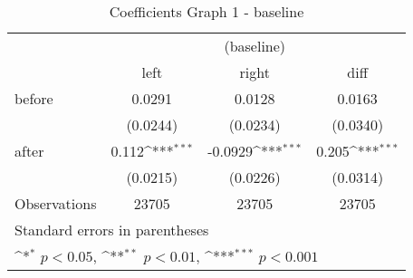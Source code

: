 \begin{table}[!ht]\centering \footnotesize
\def\sym#1{\ifmmode^{#1}\else\(^{#1}\)\fi}
\caption{Coefficients Graph 1 - baseline}
\begin{tabular}{l*{3}{c}}
\hline\hline
                    &\multicolumn{3}{c}{(baseline)}\\
                    &\multicolumn{1}{c}{left}&\multicolumn{1}{c}{right}&\multicolumn{1}{c}{diff}\\
\hline
before              &      0.0291         &      0.0128         &      0.0163         \\
                    &    (0.0244)         &    (0.0234)         &    (0.0340)         \\
[0.5em]
after               &       0.112\sym{***}&     -0.0929\sym{***}&       0.205\sym{***}\\
                    &    (0.0215)         &    (0.0226)         &    (0.0314)         \\
\hline
Observations        &       23705         &       23705         &       23705         \\
\hline\hline
\multicolumn{4}{l}{\footnotesize Standard errors in parentheses}\\
\multicolumn{4}{l}{\footnotesize \sym{*} \(p<0.05\), \sym{**} \(p<0.01\), \sym{***} \(p<0.001\)}\\
\end{tabular}
\end{table}
